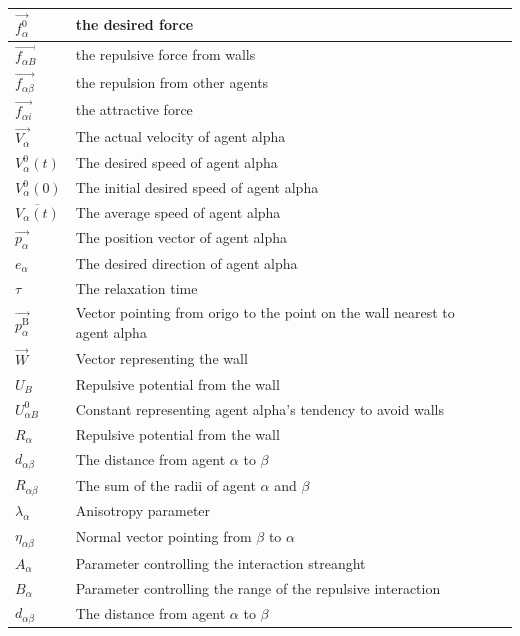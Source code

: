 \begin{center}
\begin{tabular}{lll}
\hline
$\overrightarrow{f_{\alpha}^{0}}$ & the desired force &\\
\hline
$\overrightarrow{f_{\alpha B}}$ & the repulsive force from walls &\\
\hline
$\overrightarrow{f_{\alpha \beta}}$ & the repulsion from other agents\\
\hline
$\overrightarrow{f_{\alpha i}}$& the attractive force\\
\hline
$\overrightarrow{V_{\alpha}}$ & The actual velocity of agent alpha &\\
\hline
$V_{\alpha}^{0}(t)$ & The desired speed of agent alpha &\\
\hline
$V_{\alpha}^{0}(0)$ & The initial desired speed of agent alpha &\\
\hline
$\overline{V_{\alpha}(t)}$ & The average speed of agent alpha &\\
\hline
$\overrightarrow{p_{\alpha}}$ & The position vector of agent alpha\\
\hline
$e_{\alpha}$& The desired direction of agent alpha\\
\hline
$\tau$& The relaxation time &\\
\hline
$\overrightarrow{p_{\alpha}^{\text{B}}}$& Vector pointing from origo to the point on the wall nearest to agent alpha &\\
\hline
$\overrightarrow{W}$& Vector representing the wall &\\
\hline
$U_{B}$ & Repulsive potential from the wall\\
\hline
$U^{0}_{\alpha B}$ & Constant representing agent alpha's tendency to avoid walls\\
\hline
$R_{\alpha}$& Repulsive potential from the wall\\
\hline
$d_{\alpha \beta}$& The distance from agent $\alpha$ to $\beta$ &\\
\hline
$R_{\alpha\beta}$& The sum of the radii of agent $\alpha$ and $\beta$ \\
\hline
$\lambda_{\alpha}$& Anisotropy parameter &\\
\hline
$\eta_{\alpha \beta}$& Normal vector pointing from $\beta$ to $\alpha$ \\
\hline
$A_{\alpha}$& Parameter controlling the interaction streanght \\
\hline
$B_{\alpha}$& Parameter controlling the range of the repulsive interaction  \\
\hline
$d_{\alpha \beta}$& The distance from agent $\alpha$ to $\beta$ &\\

\end{tabular}
\end{center}
